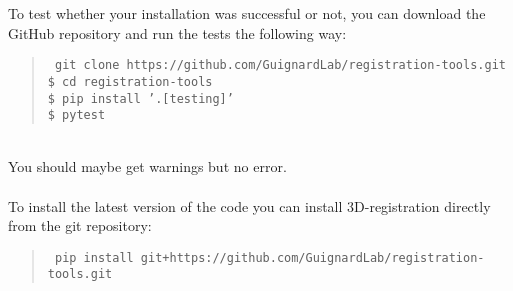 \documentclass[10pt,a4paper]{book}
\newenvironment{code}[1]{\mbox{}\\[1ex]\hspace*{-#1cm}\begin{minipage}{150mm}\begin{quote}\tt}{\end{quote}\end{minipage}\mbox{}\\[1ex]}
\begin{document}
To test whether your installation was successful or not, you can download the GitHub repository and run the tests the following way:
\begin{code}{0.8}
\$ git clone https://github.com/GuignardLab/registration-tools.git\\
\$ cd registration-tools\\
\$ pip install '.[testing]'\\
\$ pytest\\
\end{code}
You should maybe get warnings but no error.


\paragraph{}To install the latest version of the code you can install 3D-registration directly from the git repository:
\begin{code}{0.8}
\$ pip install git+https://github.com/GuignardLab/registration-tools.git\\
\end{code}
\end{document}
